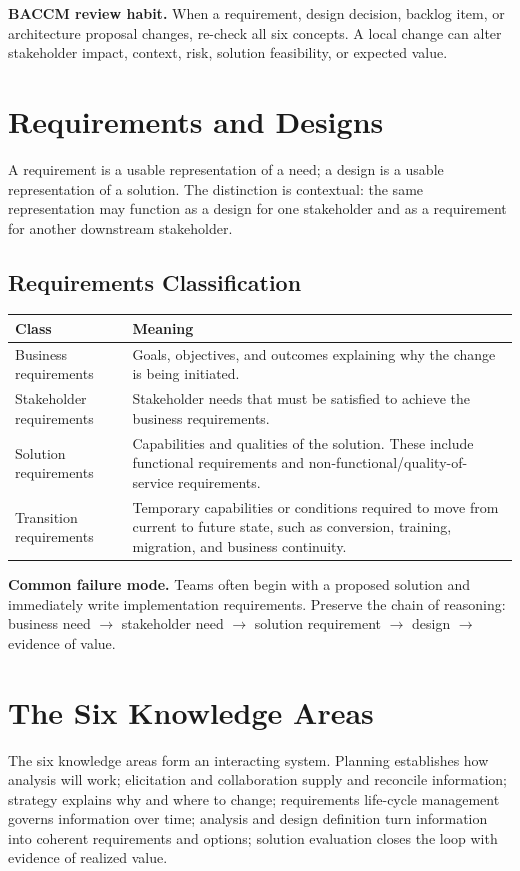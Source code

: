 \documentclass[11pt]{article}
\begin{document}
\begin{practicebox}
\textbf{BACCM review habit.} When a requirement, design decision, backlog item, or architecture proposal changes, re-check all six concepts. A local change can alter stakeholder impact, context, risk, solution feasibility, or expected value.
\end{practicebox}
\section{Requirements and Designs}
A requirement is a usable representation of a need; a design is a usable representation of a solution. The distinction is contextual: the same representation may function as a design for one stakeholder and as a requirement for another downstream stakeholder.

\subsection{Requirements Classification}
\begin{longtable}{L{0.20\textwidth} L{0.68\textwidth}}
\toprule
\textbf{Class} & \textbf{Meaning}\\
\midrule
\endhead
Business requirements & Goals, objectives, and outcomes explaining why the change is being initiated.\\
Stakeholder requirements & Stakeholder needs that must be satisfied to achieve the business requirements.\\
Solution requirements & Capabilities and qualities of the solution. These include functional requirements and non-functional/quality-of-service requirements.\\
Transition requirements & Temporary capabilities or conditions required to move from current to future state, such as conversion, training, migration, and business continuity.\\
\bottomrule
\end{longtable}

\begin{warningbox}
\textbf{Common failure mode.} Teams often begin with a proposed solution and immediately write implementation requirements. Preserve the chain of reasoning: business need $\rightarrow$ stakeholder need $\rightarrow$ solution requirement $\rightarrow$ design $\rightarrow$ evidence of value.
\end{warningbox}
\section{The Six Knowledge Areas}
The six knowledge areas form an interacting system. Planning establishes how analysis will work; elicitation and collaboration supply and reconcile information; strategy explains why and where to change; requirements life-cycle management governs information over time; analysis and design definition turn information into coherent requirements and options; solution evaluation closes the loop with evidence of realized value.
\end{document}
